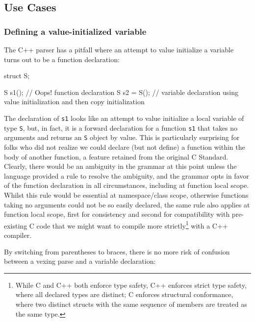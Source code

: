 \subsection[Use Cases]{Use Cases}\label{use-cases-bracedinit}

\subsubsection[Defining a value-initialized variable]{Defining a value-initialized variable}\label{defining-a-value-initialized-variable}

The C++ parser has a pitfall where an attempt to value initialize a
variable turns out to be a function declaration:

\begin{emcppslisting}[emcppsbatch=e17]
struct S{};

S s1();      // Oops! function declaration
S s2 = S();  // variable declaration using value initialization and then copy initialization
\end{emcppslisting}
    

\noindent The declaration of \lstinline!s1! looks like an attempt to value initialize
a local variable of type \lstinline!S!, but, in fact, it is a forward
declaration for a function \lstinline!s1! that takes no arguments and
returns an \lstinline!S! object by value. This is particularly surprising
for folks who did not realize we could declare (but not define) a
function within the body of another function, a feature retained from
the original C Standard. Clearly, there would be an ambiguity in the
grammar at this point unless the language provided a rule to resolve the
ambiguity, and the grammar opts in favor of the function declaration in
all circumstances, including at function local scope. Whilst this rule
would be essential at namespace/class scope, otherwise functions taking
no arguments could not be so easily declared, the same rule also applies
at function local scope, first for consistency and second for
compatibility with pre-existing C code that we might want to compile
more strictly\footnote{While C and C++ both enforce type safety, C++
enforces strict type safety, where all declared types are distinct; C
enforces structural conformance, where two distinct structs with the
same sequence of members are treated as the same type.} with a C++ compiler.

By switching from parentheses to braces, there is no more risk of
confusion between a vexing parse and a variable declaration:


